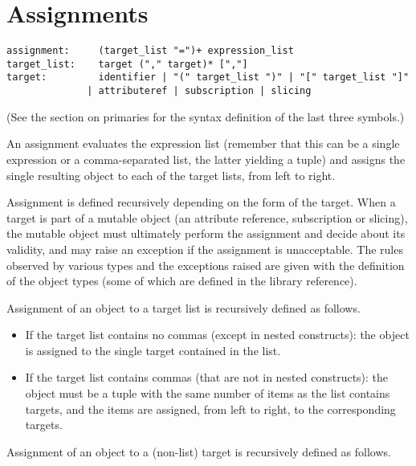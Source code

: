 \section{Assignments}

\begin{verbatim}
assignment:     (target_list "=")+ expression_list
target_list:    target ("," target)* [","]
target:         identifier | "(" target_list ")" | "[" target_list "]"
              | attributeref | subscription | slicing
\end{verbatim}

(See the section on primaries for the syntax definition of the last
three symbols.)

An assignment evaluates the expression list (remember that this can
be a single expression or a comma-separated list,
the latter yielding a tuple)
and assigns the single resulting object to each of the target lists,
from left to right.

Assignment is defined recursively depending on the form of the target.
When a target is part of a mutable object (an attribute reference,
subscription or slicing), the mutable object must ultimately perform
the assignment and decide about its validity, and may raise an
exception if the assignment is unacceptable.  The rules observed by
various types and the exceptions raised are given with the definition
of the object types (some of which are defined in the library
reference).

Assignment of an object to a target list is recursively
defined as follows.

\begin{itemize}
\item
If the target list contains no commas (except in nested constructs):
the object is assigned to the single target contained in the list.

\item
If the target list contains commas (that are not in nested constructs):
the object must be a tuple with the same number of items
as the list contains targets, and the items are assigned, from left
to right, to the corresponding targets.

\end{itemize}

Assignment of an object to a (non-list)
target is recursively defined as follows.

